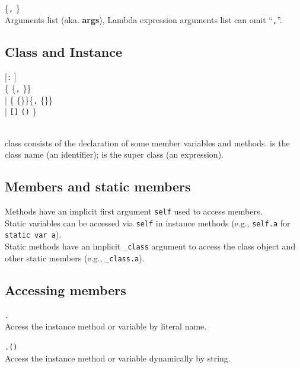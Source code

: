 \hangpar {} \{\texttt{,} \}\\
Arguments list (aka. \textbf{args}), Lambda expression arguments list can omit ``\texttt{,}''.

\subsection*{Class and Instance}
\hangpar {}  [\texttt{:} ]\\
\{ \{\texttt{,} \}\}\\
    | \{ \{\texttb{=}\}\}\{\texttt{,} \{\texttb{=}\}\}\\
    | \hangpar \texttt{[}\texttt{]}   \texttt{(}\texttt{)}  \}

\hangpar {} \\
class consists of the declaration of some member variables and methods.  is the class name (an identifier);  is the super class (an expression).

\subsection*{Members and static members}

Methods have an implicit first argument \texttt{self} used to access members.\\
Static variables can be accessed via \texttt{self} in instance methods (e.g., \texttt{self.a} for \texttt{static var a}).\\
Static methods have an implicit \texttt{\_class} argument to access the class object and other static members (e.g., \texttt{\_class.a}).

\subsection*{Accessing members}

\hangpar {}\texttt{.}\\
Access the instance method or variable by literal name.

\hangpar {}\texttt{.(}\texttt{)}\\
Access the instance method or variable dynamically by string.


